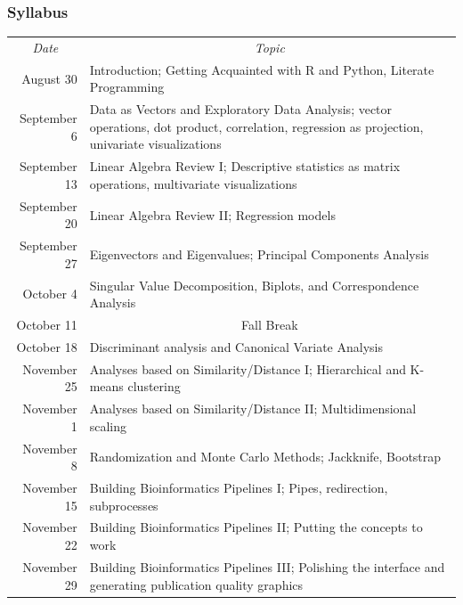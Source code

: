 \documentclass{beamer}
\begin{document}
\begin{frame}
  \frametitle{Syllabus}

\scriptsize

\renewcommand{\arraystretch}{1.1}
\begin{tabular}{rp{3.5in}}
\multicolumn{1}{c}{{\sl Date}} & \multicolumn{1}{c}{{\sl Topic}} \\
August 30 & Introduction; Getting Acquainted with R and Python, Literate Programming \\
September 6 & Data as Vectors and Exploratory Data Analysis; vector operations, dot product, correlation, regression as projection, univariate visualizations\\
September 13 & Linear Algebra Review I; Descriptive statistics as matrix operations, multivariate visualizations \\
September 20 & Linear Algebra Review II; Regression models \\
September 27 & Eigenvectors and Eigenvalues; Principal Components Analysis \\
October 4 & Singular Value Decomposition, Biplots, and Correspondence Analysis\\
October 11 & \multicolumn{1}{c}{{\sc Fall Break}} \\
October 18 & Discriminant analysis and Canonical Variate Analysis\\
November 25 & Analyses based on Similarity/Distance I; Hierarchical and K-means clustering\\
November 1 & Analyses based on Similarity/Distance II; Multidimensional scaling\\
November 8 & Randomization and Monte Carlo Methods; Jackknife, Bootstrap\\
November 15 & Building Bioinformatics Pipelines I; Pipes, redirection, subprocesses \\
November 22 & Building Bioinformatics Pipelines II; Putting the concepts to work \\ 
November 29 & Building Bioinformatics Pipelines III; Polishing the interface and generating publication quality graphics \\ 

\end{tabular}

\normalsize

\end{frame}
\end{document}
